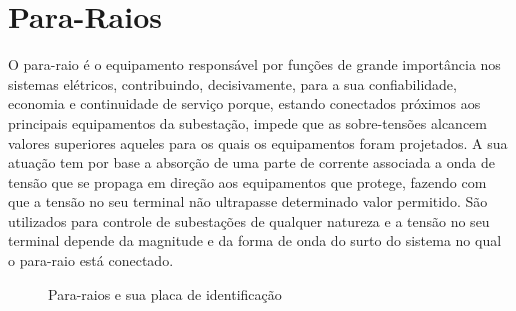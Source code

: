 \documentclass[a5paper,english,spanish,brazil]{ufsc-thesis}
\begin{document}
\section{Para-Raios}
O para-raio é o equipamento responsável por funções de grande importância nos sistemas elétricos, contribuindo, decisivamente, para a sua confiabilidade, economia e continuidade de serviço porque, estando conectados próximos aos principais equipamentos da subestação, impede que as sobre-tensões alcancem valores superiores aqueles para os quais os equipamentos foram projetados. A sua atuação tem por base a absorção de uma parte de corrente associada a onda de tensão que se propaga em direção aos equipamentos que protege, fazendo com que a tensão no seu terminal não ultrapasse determinado valor permitido. São utilizados para controle de subestações de qualquer natureza e a tensão no seu terminal depende da magnitude e da forma de onda do surto do sistema no qual o para-raio está conectado.
\begin{figure}[htb]
  \caption{Para-raios e sua placa de identificação}
  \centering
\end{figure}
\end{document}
